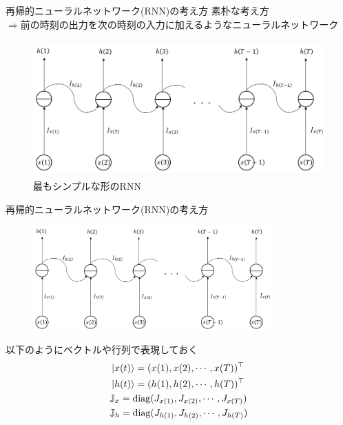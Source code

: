 \documentclass[dvipdfmx,10pt]{beamer}
\begin{document}
  \begin{frame}{再帰的ニューラルネットワーク(RNN)の考え方}
    素朴な考え方\\
    $\Rightarrow$前の時刻の出力を次の時刻の入力に加えるようなニューラルネットワーク
    \begin{figure}
      \begin{center}
        \includegraphics[height=5.2cm]{image/simple_RNN.png}
      \end{center} 
      \caption{最もシンプルな形のRNN}  
    \end{figure}
  \end{frame}

  \begin{frame}{再帰的ニューラルネットワーク(RNN)の考え方}
    \begin{figure}
      \begin{center}
        \includegraphics[height=4cm]{image/simple_RNN.png}
      \end{center} 
    \end{figure}
    以下のようにベクトルや行列で表現しておく
    \begin{align*}
      &\ket{x(t)} = (x(1),x(2),\cdots,x(T))^{\top}\\
      &\ket{h(t)} = (h(1),h(2),\cdots,h(T))^{\top}\\
      &\mathbb{J}_x = \text{diag}(J_{x(1)},J_{x(2)},\cdots,J_{x(T)})\\
      &\mathbb{J}_h = \text{diag}(J_{h(1)},J_{h(2)},\cdots,J_{h(T)})
    \end{align*}
  \end{frame}
\end{document}
